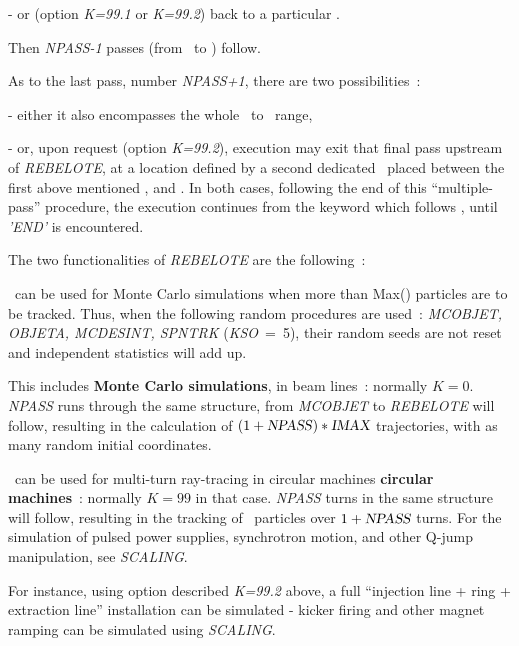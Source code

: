 - or (option \textsl{K=99.1} or \textsl{K=99.2}) back to a particular \LABEL. 

\noindent  Then  \textsl{NPASS-1} passes (from \LABEL\ to  \REBELOTE) follow.  

\noindent As to the last pass, number  \textsl{NPASS+1}, there are two possibilities~: 

- either it also encompasses the whole \LABEL\ to  \REBELOTE\ range, 

- or, upon request (option \textsl{K=99.2}),  execution may exit that final  pass upstream of 
\textsl{REBELOTE}, at a location defined by a second   dedicated \LABEL\ placed  between 
the first above mentioned \LABEL, and \REBELOTE. 
In both cases, following the end of this ``multiple-pass'' procedure, 
the execution  continues from the keyword which follows \REBELOTE, until \textsl{'END'} is encountered. 

\bigskip

The two functionalities of \textsl{REBELOTE} are the following~: 

\smallskip

\noindent {\small $\bullet$} \REBELOTE\ can be used for Monte Carlo simulations when more 
than Max(\IMAX) particles   are to be tracked. 
Thus, when the following random procedures 
are used~: \textsl{MCOBJET, OBJETA, MCDESINT, 
SPNTRK} \mbox{(\textsl{KSO} = 5)},
their random seeds are not reset and  independent statistics will add up. 

\noindent This includes  \textbf{Monte Carlo simulations}, in beam lines~: normally $ K=0$.  \textsl{NPASS} runs
through the same structure, from \textsl{MCOBJET} to \textsl{REBELOTE} will follow, resulting in the calculation of 
$(1+\text{\textsl{NPASS}})  \ast  \text{\ensuremath{\textsl{IMAX}}}$ trajectories, with as many random initial coordinates. 

\bigskip

\noindent {\small $\bullet$} \REBELOTE\ can be used for  multi-turn ray-tracing   
in circular machines \textbf{circular machines}~: normally $ K=99$ in that case.  \textsl{NPASS} turns in
the same structure will follow, resulting in the tracking of \IMAX\ 
particles over $1+\text{\textsl{NPASS}}$ turns. For the simulation of 
pulsed power supplies, synchrotron motion, and other Q-jump manipulation, see \textsl{SCALING}. 

\noindent For instance, using option described \textsl{K=99.2} above, a full ``injection line + ring + extraction line'' installation 
can be simulated - kicker firing  and other magnet ramping can be simulated using \textsl{SCALING}. 

